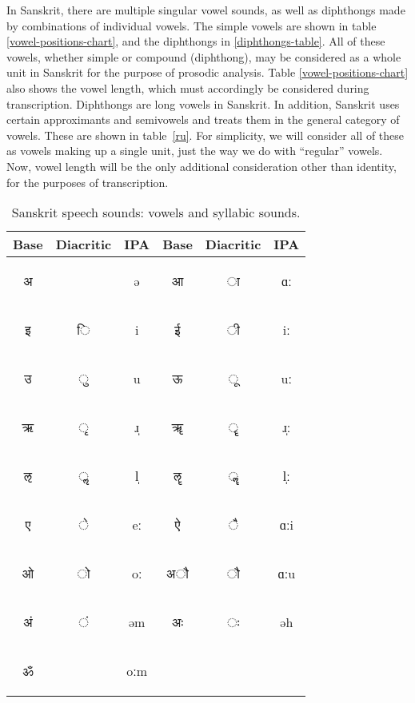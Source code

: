 \documentclass[10pt,a4paper]{article}
\newcommand{\sansk}[1]{\begin{sanskrit}#1\end{sanskrit}}
\begin{document}
In Sanskrit, there are multiple singular vowel sounds, as well as diphthongs made by combinations of individual vowels. The simple vowels are shown in table \ref{vowel-positions-chart}, and the diphthongs in \ref{diphthongs-table}. All of these vowels, whether simple or compound (diphthong), may be considered as a whole unit in Sanskrit for the purpose of prosodic analysis. 
Table \ref{vowel-positions-chart} also shows the vowel length, which must accordingly be considered during transcription. Diphthongs are long vowels in Sanskrit.
In addition, Sanskrit uses certain approximants and semivowels and treats them in the general category of vowels. These are shown in table~\ref{ru}. For simplicity, we will consider all of these as vowels making up a single unit, just the way we do with ``regular'' vowels. Now, vowel length will be the only additional consideration other than identity, for the purposes of transcription.



\begin{table}[ht]
	\centering
		
	\begin{center}
		\begin{tabular}{|c|c|c||c|c|c|}
			\hline
			\textbf{Base}&\multirow{1}{*}{\textbf{Diacritic}}&\multirow{1}{*}{\textbf{IPA}}&\textbf{Base} &\multirow{1}{*}{\textbf{Diacritic}}&\multirow{1}{*}{\textbf{IPA}} \\
			\hline%
			\sansk{अ}&&ə& \sansk{आ}& \sansk{ा}&ɑː\\\hline
			\sansk{इ}& \sansk{ि}&i&	\sansk{ई}& \sansk{ी}&iː\\\hline
			\sansk{उ}&\sansk{ ु}&u&
			\sansk{ऊ}& \sansk{ ू}&uː\\\hline
			\sansk{ऋ}&\sansk{ ृ}&ɹ̩&\sansk{ॠ} &\sansk{ ॄ}&ɹ̩ː\\\hline
			\sansk{ऌ}&\sansk{	ॢ}&l̩&\sansk{ॡ} &\sansk{ॣ}&l̩ː\\\hline
			\sansk{ए}&\sansk{ े}&eː& \sansk{ऐ} & \sansk{	ै}&ɑːi\\\hline
			\sansk{ओ}& 	\sansk{ो }&oː&	\sansk{	अाै}&\sansk{ाै}&  ɑːu\\\hline
			\sansk{अं}& \sansk{	ं }&əm&	\sansk{अः}&	\sansk{ः} & əh\\\hline
			\sansk{ॐ} &&oːm&&&%
			\\\hline
			
		\end{tabular}
		\caption{Sanskrit speech sounds: vowels and syllabic sounds.}
		\label{vowels-table}
	\end{center}
\end{table}
\end{document}
